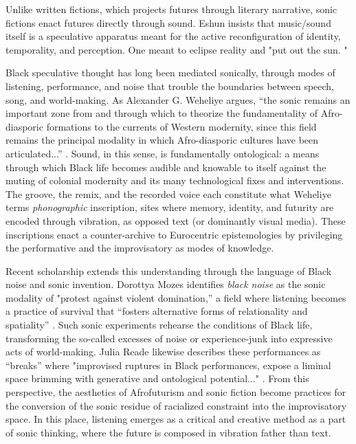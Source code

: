  Unlike written fictions, which projects futures through literary narrative, sonic fictions enact futures directly through sound. Eshun insists that music/sound itself is a speculative apparatus meant for the active reconfiguration of identity, temporality, and perception. One meant to eclipse reality and "put out the sun. \parencite[p. 4]{Eshun_1999}"   

Black speculative thought has long been mediated sonically, through modes of listening, performance, and noise that trouble the boundaries between speech, song, and world-making.  As Alexander G. Weheliye argues, “the sonic remains an important zone from and through which to theorize the fundamentality of Afro-diasporic formations to the currents of Western modernity, since this field remains the principal modality in which Afro-diasporic cultures have been articulated...” \parencite[p.5]{Weheliye_2005}. Sound, in this sense, is fundamentally ontological: a means through which Black life becomes audible and knowable to itself against the muting of colonial modernity and its many technological fixes and interventions. The groove, the remix, and the recorded voice each constitute what Weheliye terms \emph{phonographic} inscription, sites where memory, identity, and futurity are encoded through vibration, as opposed text (or dominantly visual media). These inscriptions enact a counter-archive to Eurocentric epistemologies by privileging the performative and the improvisatory as modes of knowledge. 

Recent scholarship extends this understanding through the language of Black noise and sonic invention. Dorottya Mozes identifies \emph{black noise} as the sonic modality of "protest against violent domination,” a field where listening becomes a practice of survival that “fosters alternative forms of relationality and spatiality” \parencite[167-172]{Mozes_2022}.  Such sonic experiments rehearse the conditions of Black life, transforming the so-called excesses of noise or experience-junk into expressive acts of world-making.  Julia Reade likewise describes these performances as “breaks” where "improvised ruptures in Black performances, expose a liminal space brimming with generative and ontological potential..."  \parencite[3]{Reade_2023}.  From this perspective, the aesthetics of Afrofuturism and sonic fiction become practices for the conversion of the sonic residue of racialized constraint into the improvisatory space. In this place, listening emerges as a critical and creative method as a part of sonic thinking, where the future is composed in vibration father than text.       

